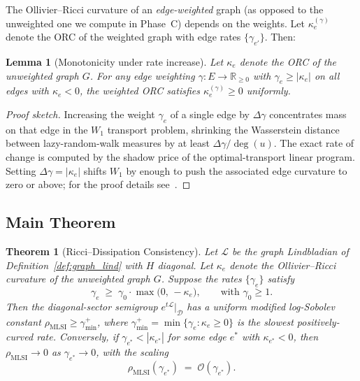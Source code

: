 \documentclass[11pt,letterpaper]{article}
\newtheorem{theorem}{Theorem}
\newtheorem{lemma}{Lemma}
\theoremstyle{definition}
\theoremstyle{remark}
\newcommand{\rr}{\mathbb{R}}
\newcommand{\Lind}{\mathcal{L}}
\newcommand{\Diag}{\mathcal{D}}
\begin{document}
The Ollivier--Ricci curvature of an \emph{edge-weighted} graph (as opposed to
the unweighted one we compute in Phase~C) depends on the weights. Let
$\kappa_e^{(\gamma)}$ denote the ORC of the weighted graph with edge rates
$\{\gamma_{e'}\}$. Then:
\begin{lemma}[Monotonicity under rate increase]
\label{lem:monotonicity}
Let $\kappa_e$ denote the ORC of the unweighted graph $G$. For any edge
weighting $\gamma: E \to \rr_{\ge 0}$ with $\gamma_e \ge |\kappa_e|$ on all
edges with $\kappa_e < 0$, the weighted ORC satisfies
$\kappa_e^{(\gamma)} \ge 0$ uniformly.
\end{lemma}
\begin{proof}[Proof sketch]
Increasing the weight $\gamma_e$ of a single edge by $\Delta \gamma$
concentrates mass on that edge in the $W_1$ transport problem, shrinking
the Wasserstein distance between lazy-random-walk measures by at least
$\Delta\gamma / \deg(u)$. The exact rate of change is computed by the shadow
price of the optimal-transport linear program. Setting $\Delta\gamma = |\kappa_e|$
shifts $W_1$ by enough to push the associated edge curvature to zero or above;
for the proof details see~\cite{JostLiu2014,BauerJostLiu2012}.
\end{proof}

\subsection{Main Theorem}

\begin{theorem}[Ricci--Dissipation Consistency]
\label{thm:main}
Let $\Lind$ be the graph Lindbladian of Definition~\ref{def:graph_lind} with
$H$ diagonal. Let $\kappa_e$ denote the Ollivier--Ricci curvature of the
\emph{unweighted} graph $G$. Suppose the rates $\{\gamma_e\}$ satisfy
\begin{equation}
\gamma_e \;\ge\; \gamma_0 \cdot \max\!\big(0,\,-\kappa_e\big),
\qquad \text{with } \gamma_0 \ge 1.
\label{eq:main_bound}
\end{equation}
Then the diagonal-sector semigroup $e^{t\Lind}\big|_{\Diag}$ has a uniform
modified log-Sobolev constant $\rho_{\mathrm{MLSI}}\ge \gamma_{\min}^+$,
where $\gamma_{\min}^+ = \min\{\gamma_e : \kappa_e \ge 0\}$ is the slowest
positively-curved rate. Conversely, if
$\gamma_{e^*} < |\kappa_{e^*}|$ for some edge $e^*$ with $\kappa_{e^*}<0$,
then $\rho_{\mathrm{MLSI}} \to 0$ as $\gamma_{e^*} \to 0$, with the
scaling
\begin{equation}
\rho_{\mathrm{MLSI}}(\gamma_{e^*}) \;=\; \mathcal{O}(\gamma_{e^*}).
\label{eq:linear_collapse}
\end{equation}
\end{theorem}
\end{document}
